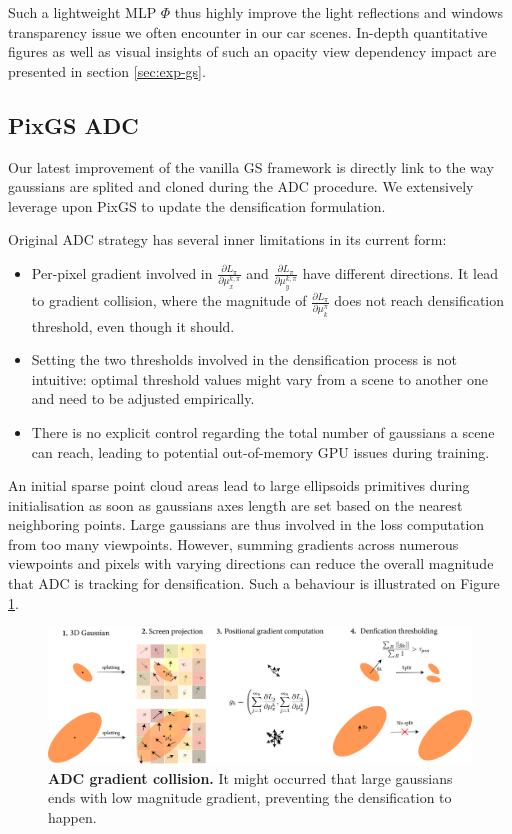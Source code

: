 Such a lightweight \ac{MLP} $\Phi$ thus highly improve the light reflections and windows transparency issue we often encounter in our car scenes. In-depth quantitative figures as well as visual insights of such an opacity view dependency impact are presented in section \ref{sec:exp-gs}. 

\subsection{PixGS ADC}
\label{gs:pixgs-adc}
Our latest improvement of the vanilla GS framework is directly link to the way gaussians are splited and cloned during the \ac{ADC} procedure. We extensively leverage upon PixGS \citep{zhang2024pixelgs} to update the densification formulation.  

Original \ac{ADC} strategy has several inner limitations in its current form: 
\begin{itemize}
    \item Per-pixel gradient involved in $\frac{\partial L_{\pi}}{\partial \mu^{k,\pi}_{x}}$ and $\frac{\partial L_{\pi}}{\partial \mu^{k,\pi}_{y}}$  have different directions. It lead to gradient collision, where the magnitude of $\frac{\partial L_{\pi}}{\partial \mu_{k}^{\pi}}$ does not reach densification threshold, even though it should. 
    \item Setting the two thresholds involved in the densification process is not intuitive: optimal threshold values might vary from a scene to another one and need to be adjusted empirically.
    \item There is no explicit control regarding the total number of gaussians a scene can reach, leading to potential out-of-memory \ac{GPU} issues during training.
\end{itemize}

An initial sparse point cloud areas lead to large ellipsoids primitives during initialisation as soon as gaussians axes length are set based on the nearest neighboring points. Large gaussians are thus involved in the loss computation from too many viewpoints. However, summing gradients across numerous viewpoints and pixels with varying directions can reduce the overall magnitude that \ac{ADC} is tracking for densification. Such a behaviour is illustrated on Figure \ref{fig:adc-limitation}. 

\begin{figure}[htbp!]
    \center
  \includegraphics[width=\linewidth]{images/gaussiansplatting/adc_limitation_NEW.png}
  \caption{\textbf{ADC gradient collision.} It might occurred that large gaussians ends with low magnitude gradient, preventing the densification to happen.}
  \label{fig:adc-limitation}
\end{figure}

